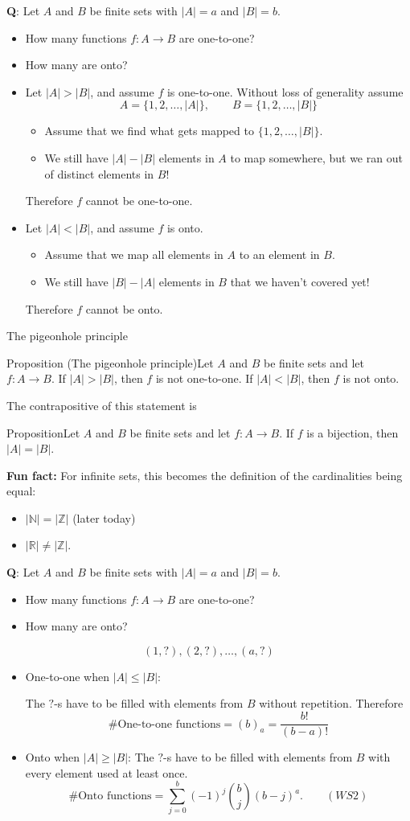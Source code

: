 \documentclass{beamer}
\def\bl[#1]#2{\begin{block}{#1}#2\end{block}}
\def\itemb{\begin{itemize}}
\def\iteme{\end{itemize}}
\begin{document}
\begin{frame}
\bl[]{\textbf{Q}: Let $A$ and $B$ be finite sets with $|A|=a$ and $|B|=b$.
\itemb
\item How many functions $f:A\to B$ are one-to-one? 
\item How many are onto?
\iteme}
\itemb
\item Let $|A|>|B|$, and assume $f$ is one-to-one. Without loss of generality assume
\[
A=\{1,2,\dots,|A|\},\qquad B=\{1,2,\dots,|B|\}
\]\vspace{-0.4cm}
\itemb
\item Assume that we find what gets mapped to $\{1,2,\dots,|B|\}$.
\item We still have $|A|-|B|$ elements in $A$ to map somewhere, but we ran out of distinct elements in $B$!
\iteme
Therefore $f$ cannot be one-to-one.
\item Let $|A|<|B|$, and assume $f$ is onto.
\itemb
\item Assume that we map all elements in $A$ to an element in $B$. 
\item We still have $|B|-|A|$ elements in $B$ that we haven't covered yet!
\iteme
Therefore $f$ cannot be onto.
\iteme
\end{frame}

\begin{frame}{The pigeonhole principle}

\bl[Proposition (The pigeonhole principle)]{Let $A$ and $B$ be finite sets and let $f:A\to B$. If $|A|>|B|$, then $f$ is not one-to-one. If $|A|<|B|$, then $f$ is not onto.}
The contrapositive of this statement is
\bl[Proposition]{Let $A$ and $B$ be finite sets and let $f:A\to B$. If $f$ is a bijection, then $|A|=|B|$.}
\textbf{Fun fact:} For infinite sets, this becomes the definition of the cardinalities being equal:
\itemb
\item $|\mathbb{N}|=|\mathbb{Z}|$ (later today)
\item $|\mathbb{R}|\neq |\mathbb{Z}|$.
\iteme
\end{frame}

\begin{frame}
\bl[]{\textbf{Q}: Let $A$ and $B$ be finite sets with $|A|=a$ and $|B|=b$.
\itemb
\item How many functions $f:A\to B$ are one-to-one? 
\item How many are onto?
\iteme}\vspace{-0.3cm}
\[
(1,?),(2,?),\dots, (a,?)
\]\vspace{-0.3cm}
\itemb
\item One-to-one when $|A|\leq|B|$:

The $?$-s have to be filled with elements from $B$ without repetition. Therefore
\[
\#\textrm{One-to-one functions}=(b)_{a}=\frac{b!}{(b-a)!}
\]
\item Onto when $|A|\geq|B|$:
The $?$-s have to be filled with elements from $B$ with every element used at least once.
\[
\#\textrm{Onto functions}=\sum_{j=0}^{b}(-1)^j\binom{b}{j}(b-j)^{a}.\qquad (WS2)
\]
\iteme

\end{frame}
\end{document}
